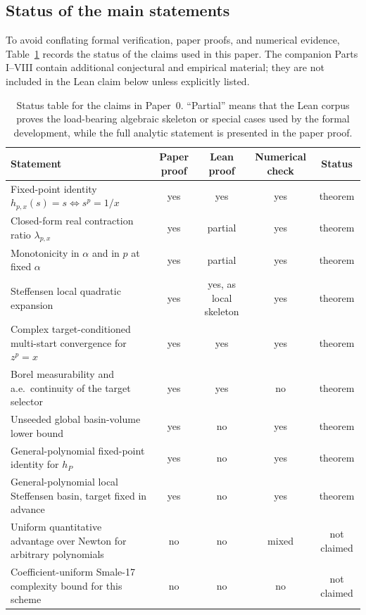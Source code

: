 \documentclass[11pt,a4paper]{article}
\theoremstyle{definition}
\begin{document}
\subsection{Status of the main statements}

To avoid conflating formal verification, paper proofs, and numerical evidence,
Table~\ref{tab:claim-status} records the status of the claims used in this
paper. The companion Parts I--VIII contain additional conjectural and empirical
material; they are not included in the Lean claim below unless explicitly
listed.

\begin{table}[H]
\centering
\small
\renewcommand{\arraystretch}{1.15}
\begin{tabular}{p{}cccc}
\toprule
Statement & Paper proof & Lean proof & Numerical check & Status \\
\midrule
Fixed-point identity $h_{p,x}(s)=s \iff s^p=1/x$ & yes & yes & yes & theorem \\
Closed-form real contraction ratio $\lambda_{p,x}$ & yes & partial & yes & theorem \\
Monotonicity in $\alpha$ and in $p$ at fixed $\alpha$ & yes & partial & yes & theorem \\
Steffensen local quadratic expansion & yes & yes, as local skeleton & yes & theorem \\
Complex target-conditioned multi-start convergence for $z^p=x$ & yes & yes & yes & theorem \\
Borel measurability and a.e.\ continuity of the target selector & yes & yes & no & theorem \\
Unseeded global basin-volume lower bound & yes & no & yes & theorem \\
General-polynomial fixed-point identity for $h_P$ & yes & no & yes & theorem \\
General-polynomial local Steffensen basin, target fixed in advance & yes & no & yes & theorem \\
Uniform quantitative advantage over Newton for arbitrary polynomials & no & no & mixed & not claimed \\
Coefficient-uniform Smale-17 complexity bound for this scheme & no & no & no & not claimed \\
\bottomrule
\end{tabular}
\caption{Status table for the claims in Paper~0. ``Partial'' means that the
Lean corpus proves the load-bearing algebraic skeleton or special cases used by
the formal development, while the full analytic statement is presented in the
paper proof.}
\label{tab:claim-status}
\end{table}
\end{document}
